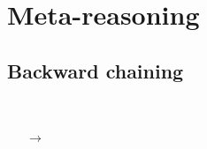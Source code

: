 \documentclass[aspectratio=169]{beamer}
\begin{document}
\section{Meta-reasoning}

\subsection{Backward chaining}

\begin{frame}



  \begin{columns}

    \column{1cm}

    {\tiny
    \begin{prooftree}
    \end{prooftree}
    }

    \column{1cm}

    \pause

    \begin{center}
      \\
      $\rightarrow$\\
      \\
    \end{center}

    \column{4cm}

    \begin{center}
    \end{center}

    {\tiny
    \begin{prooftree}
    \end{prooftree}
    }


\end{columns}
\end{frame}
\end{document}
